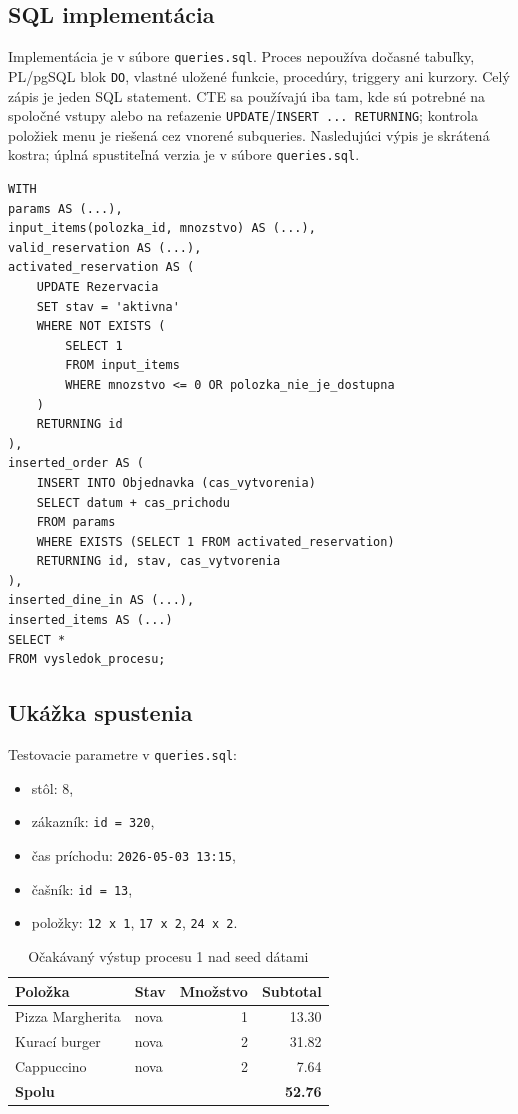 \documentclass[11pt, a4paper]{article}
\begin{document}
\subsection*{SQL implementácia}

Implementácia je v súbore \texttt{queries.sql}. Proces nepoužíva dočasné tabuľky, PL/pgSQL blok
\texttt{DO}, vlastné uložené funkcie, procedúry, triggery ani kurzory. Celý zápis je jeden SQL
statement. CTE sa používajú iba tam, kde sú potrebné na spoločné vstupy alebo na reťazenie
\texttt{UPDATE}/\texttt{INSERT ... RETURNING}; kontrola položiek menu je riešená cez vnorené
subqueries.
Nasledujúci výpis je skrátená kostra; úplná spustiteľná verzia je v súbore \texttt{queries.sql}.

\begin{lstlisting}
WITH
params AS (...),
input_items(polozka_id, mnozstvo) AS (...),
valid_reservation AS (...),
activated_reservation AS (
    UPDATE Rezervacia
    SET stav = 'aktivna'
    WHERE NOT EXISTS (
        SELECT 1
        FROM input_items
        WHERE mnozstvo <= 0 OR polozka_nie_je_dostupna
    )
    RETURNING id
),
inserted_order AS (
    INSERT INTO Objednavka (cas_vytvorenia)
    SELECT datum + cas_prichodu
    FROM params
    WHERE EXISTS (SELECT 1 FROM activated_reservation)
    RETURNING id, stav, cas_vytvorenia
),
inserted_dine_in AS (...),
inserted_items AS (...)
SELECT *
FROM vysledok_procesu;
\end{lstlisting}

\subsection*{Ukážka spustenia}

Testovacie parametre v \texttt{queries.sql}:
\begin{itemize}
    \item stôl: 8,
    \item zákazník: \texttt{id = 320},
    \item čas príchodu: \texttt{2026-05-03 13:15},
    \item čašník: \texttt{id = 13},
    \item položky: \texttt{12 x 1}, \texttt{17 x 2}, \texttt{24 x 2}.
\end{itemize}

\begin{table}[H]
\centering
\small
\begin{tabular}{llrr}
\toprule
\textbf{Položka} & \textbf{Stav} & \textbf{Množstvo} & \textbf{Subtotal} \\
\midrule
Pizza Margherita & nova & 1 & 13.30 \\
Kurací burger & nova & 2 & 31.82 \\
Cappuccino & nova & 2 & 7.64 \\
\midrule
\textbf{Spolu} & & & \textbf{52.76} \\
\bottomrule
\end{tabular}
\caption{Očakávaný výstup procesu 1 nad seed dátami}
\end{table}
\end{document}

